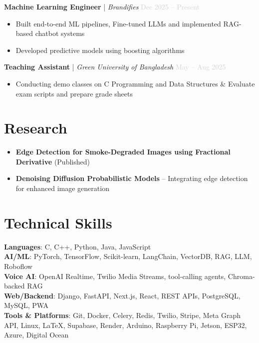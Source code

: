 \documentclass[letterpaper,11pt]{extarticle}
\begin{document}
\textbf{Machine Learning Engineer} | \textit{Brandifies} \hfill \textcolor{lightgray}{Dec 2025 -- Present}
\begin{itemize}[noitemsep, topsep=0pt]
    \item Built end-to-end ML pipelines, Fine-tuned LLMs and implemented RAG-based chatbot systems
    \item Developed predictive models using boosting algorithms
\end{itemize}

\textbf{Teaching Assistant} | \textit{Green University of Bangladesh} \hfill \textcolor{lightgray}{May -- Aug 2025}
\begin{itemize}[noitemsep, topsep=0pt]
    \item Conducting demo classes on C Programming and Data Structures \& Evaluate exam scripts and prepare grade sheets
\end{itemize}

\section{Research}
\begin{itemize}[noitemsep, topsep=0pt]
    \item \textbf{Edge Detection for Smoke-Degraded Images using Fractional Derivative} (Published)
    \item \textbf{Denoising Diffusion Probabilistic Models} -- Integrating edge detection for enhanced image generation
\end{itemize}

\section{Technical Skills}
\small{
\textbf{Languages}: C, C++, Python, Java, JavaScript \\
\textbf{AI/ML}: PyTorch, TensorFlow, Scikit-learn, LangChain, VectorDB, RAG, LLM, Roboflow \\
\textbf{Voice AI}: OpenAI Realtime, Twilio Media Streams, tool-calling agents, Chroma-backed RAG \\
\textbf{Web/Backend}: Django, FastAPI, Next.js, React, REST APIs, PostgreSQL, MySQL, PWA \\
\textbf{Tools \& Platforms}: Git, Docker, Celery, Redis, Twilio, Stripe, Meta Graph API, Linux, LaTeX, Supabase, Render, Arduino, Raspberry Pi, Jetson, ESP32, Azure, Digital Ocean
}
\end{document}
